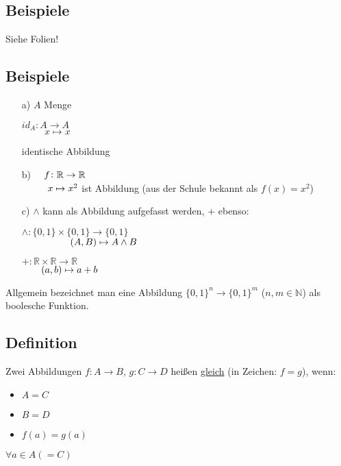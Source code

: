 \documentclass[a4paper, 12pt, twoside] {article}
\begin{document}
\subsection{Beispiele} %
Siehe Folien!

\subsection{Beispiele} %

\begin{itemize}
\item[a)] $A$ Menge

	$id_A \colon A \rightarrow A$ \\
	$\text{\qquad\space} x \mapsto x$
	
	identische Abbildung
	
\item[b)] 
		$\text{\quad} f \colon \mathbb{R} \rightarrow \mathbb{R}$ \\
		$\text{\space\qquad\space} x \mapsto x^2$ ist Abbildung (aus der Schule bekannt als $f(x)=x^2$)
		
\item[c)] $\land$ kann als Abbildung aufgefasst werden, $+$ ebenso:

$\land \colon \{0,1\} \times \{0,1\} \rightarrow \{0,1\}$ \\
$\text{\qquad\qquad\quad} (A,B) \mapsto A \land B$

$+ \colon \mathbb{R} \times \mathbb{R} \rightarrow \mathbb{R}$ \\
$\text{\qquad}(a,b) \mapsto a+b$
\end{itemize}

Allgemein bezeichnet man eine Abbildung $\{0,1\}^n \rightarrow \{0,1\}^m$ ($n,m \in \mathbb{N}$) als boolesche Funktion.

\subsection[Definition (Gleichheit von Abbildungen)]{Definition} %

Zwei Abbildungen $f \colon A \rightarrow B$, $g \colon C \rightarrow D$ heißen \underline{gleich} (in Zeichen: $f=g$), wenn:
\begin{itemize}
\item $A=C$
\item $B=D$
\item $f(a)=g(a)$
\end{itemize}
$\forall a \in A (=C)$
\end{document}
